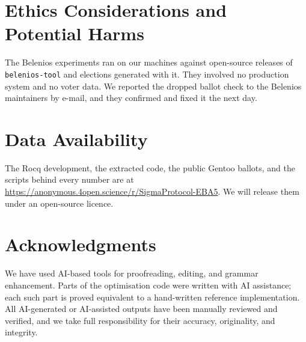\documentclass[conference,compsoc,a4paper]{IEEEtran}
\begin{document}
\section*{Ethics Considerations and Potential Harms}\label{sec:ethics}
The Belenios experiments ran on our machines against open-source
releases of \texttt{belenios-tool} and elections generated with it. They
involved no production system and no voter data. We reported the dropped
ballot check to the Belenios maintainers by e-mail, and they confirmed 
and fixed it the next day.

\section*{Data Availability}
The Rocq development, the extracted code, the
public Gentoo ballots, and the scripts behind every number are at
\url{https://anonymous.4open.science/r/SigmaProtocol-EBA5}. We will
release them under an open-source licence.

\section*{Acknowledgments}
We have used AI-based tools for proofreading, editing, and grammar 
enhancement. Parts of the optimisation code were written with AI
assistance; each such part is proved equivalent to a hand-written
reference implementation. All AI-generated or AI-assisted outputs have been 
manually reviewed and verified, and we take full responsibility 
for their accuracy, originality, and integrity.



\appendices


%


\end{document}
